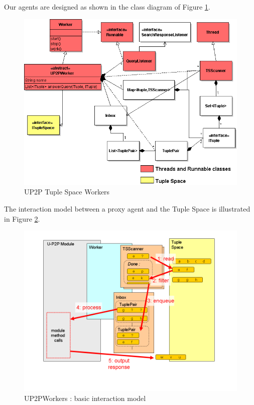 \documentclass[titlepage]{article}%
\begin{document}
Our agents are designed as shown in the class diagram of Figure \ref{fig:TSWorkerClass}.
\begin{figure}[htb]
\centering
	\includegraphics[scale=0.5]{diagrams/UP2PTSWorkerClassesColor.png}
	\caption{UP2P Tuple Space Workers}
	\label{fig:TSWorkerClass}
\end{figure}

The interaction model between a proxy agent and the Tuple Space is illustrated in Figure \ref{fig:WorkerInteraction}.
\begin{figure}[htb]
\centering
	\includegraphics[scale=0.4]{diagrams/WorkerInteraction.png}
	\caption{UP2PWorkers : basic interaction model}
	\label{fig:WorkerInteraction}
\end{figure}
\end{document}

